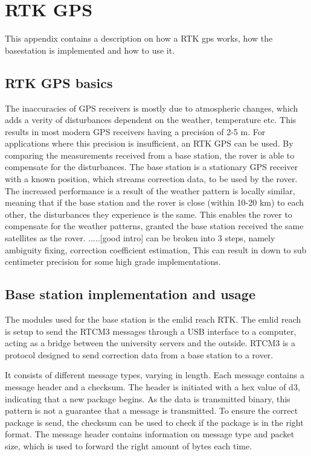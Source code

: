 \chapter{RTK GPS}\label{app:rtk_gps}
This appendix contains a description on how a RTK gps works, how the basestation is implemented and how to use it.


\section{RTK GPS basics}
The inaccuracies of GPS receivers is mostly due to atmospheric changes, which adds a verity of disturbances dependent on the weather, temperature etc.
This results in most modern GPS receivers having a precision of 2-5 m. 
For applications where this precision is insufficient, an RTK GPS can be used. 
By comparing the measurements received from a base station, the rover is able to compensate for the disturbances.
The base station is a stationary GPS receiver with a known position, which streams correction data, to be used by the rover. 
The increased performance is a result of the weather pattern is locally similar, meaning that if the base station and the rover is close (within 10-20 km) to each other, the disturbances they experience is the same.
This enables the rover to compensate for the weather patterns, granted the base station received the same satellites as the rover.
.....[good intro] can be broken into 3 steps, namely ambiguity fixing, correction coefficient estimation,
This can result in down to sub centimeter precision for some high grade implementations.

\section{Base station implementation and usage}
The modules used for the base station is the emlid reach RTK.
The emlid reach is setup to send the RTCM3 messages through a USB interface to a computer, acting as a bridge between the university servers and the outside. 
RTCM3 is a protocol designed to send correction data from a base station to a rover. 


It consists of different message types, varying in length.
Each message contains a message header and a checksum. 
The header is initiated with a hex value of d3, indicating that a new package begins. 
As the data is transmitted binary, this pattern is not a guarantee that a message is transmitted. 
To ensure the correct package is send, the checksum can be used to check if the package is in the right format. 
The message header contains information on message type and packet size, which is used to forward the right amount of bytes each time.

